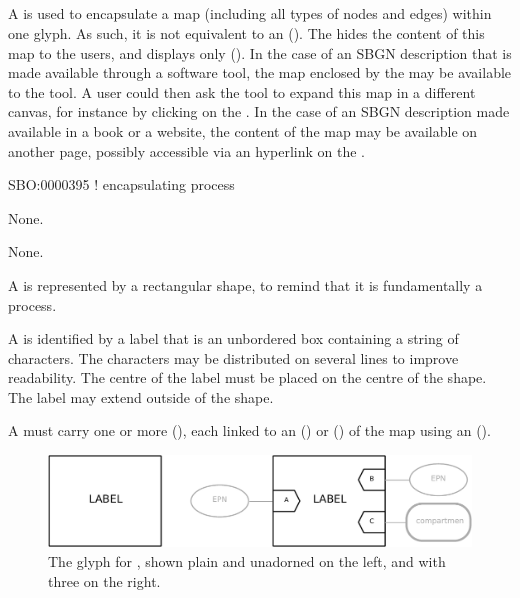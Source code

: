 \subsection{}\label{sec:submap}


A  is used to encapsulate a map (including all types of nodes and edges) within one glyph.
As such, it is not equivalent to an  ().
The  hides the content of this map to the users, and displays only  ().
In the case of an SBGN description that is made available through a software tool, the map enclosed by the   may be available to the tool.
A user could then ask the tool to expand this map in a different canvas, for instance by clicking on the .
In the case of an SBGN description made available in a book or a website, the content of the map may be available on another page, possibly accessible via an hyperlink on the .

\begin{glyphDescription}

\glyphSboTerm
SBO:0000395 ! encapsulating process

\glyphIncoming
None.

\glyphOutgoing
None.

\glyphContainer
A  is represented by a rectangular shape, to remind that it is fundamentally a process.

\glyphLabel
A  is identified by a label that is an unbordered box containing a string of characters.
The characters may be distributed on several lines to improve readability.
The centre of the label must be placed on the centre of the shape.
The label may extend outside of the shape.

\glyphAux
A  must carry one or more  (), each linked to an  () or  () of the map using an  ().

\end{glyphDescription}

\begin{figure}
\begin{center}
\includegraphics[scale=0.7]{images/build/submap.pdf}
\caption{The \PD glyph for , shown plain and unadorned on the left, and with three  on the right.}
\label{fig:submap}
\end{center}
\end{figure}


